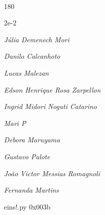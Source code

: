 \documentclass[12pt]{article}
\begin{document}

\pagebreak			

	\ 
	\vfill
	\begin{turn}{180}	
		\begin{minipage}{\textwidth}
		  	\ttfamily %
			\centering
			{\Huge 2e-2}
		  
			\hfill
		  
			

\textit{\small Júlia Demenech Mori}

\textit{\small Danilo Calcanhoto}

\textit{\small Lucas Malezan}

\textit{\small Edson Henrique Rosa Zarpellon}

\textit{\small Ingrid Midori Noguti Catarino}

\textit{\small Mari P}

\textit{\small Debora Maruyama}

\textit{\small Gustavo Palote}

\textit{\small João Victor Messias Romagnoli}

\textit{\small Fernanda Martins}

\bigskip

eins!.py
0x003b


		\end{minipage}	
	\end{turn}
	\vfill
	\

\pagebreak
\end{document}

